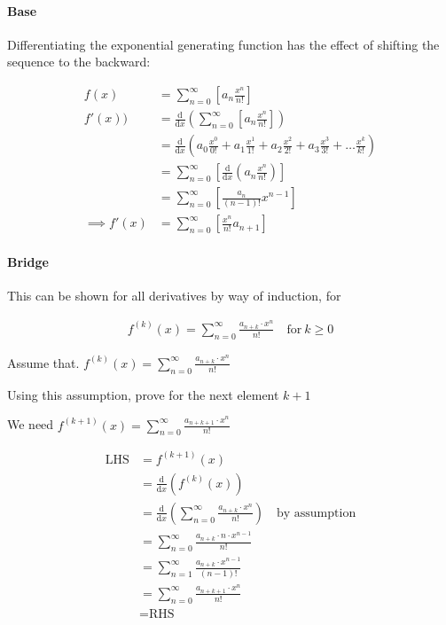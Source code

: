\documentclass[11pt]{article}
\begin{document}
\paragraph{Base}
\label{sec:org97cfa18}
Differentiating the exponential generating function has the effect of shifting the sequence to the backward: \cite{lehmanReadingsMathematicsComputer2010}

\begin{align}
    f\left( x \right) &= \sum^{\infty}_{n= 0}   \left[ a_n \frac{x^n}{n!} \right] \label{eq:exp-pow-series} \\
f'\left( x \right)) &= \frac{\mathrm{d} }{\mathrm{d} x}\left( \sum^{\infty}_{n= 0}   \left[ a_n \frac{x^n}{n!} \right]  \right) \nonumber \\
&= \frac{\mathrm{d}}{\mathrm{d} x} \left( a_0 \frac{x^0}{0!} +  a_1 \frac{x^1}{1!} +  a_2 \frac{x^2}{2!}+  a_3 \frac{x^3}{3! } +  \ldots \frac{x^k}{k!} \right) \nonumber \\
&= \sum^{\infty}_{n= 0}   \left[ \frac{\mathrm{d} }{\mathrm{d} x}\left( a_n \frac{x^n}{n!} \right) \right] \nonumber \\
&= \sum^{\infty}_{n= 0}   {\left[{ \frac{a_n}{{\left({ n- 1 }\right)!}} } x^{n- 1}  \right]} \nonumber \\
\implies f'(x) &= \sum^{\infty}_{n= 0}   {\left[{ \frac{x^n}{n!}a_{n+  1} }\right]} \label{eq:exp-pow-series-sol}
\end{align}

\paragraph{Bridge}
\label{sec:org373b494}
This can be shown for all derivatives by way of induction, for

\begin{align}
f^{(k)}\left(x\right) = \sum_{n=0}^\infty\frac{a_{n+k}\cdot x^n}{n!} \quad \text{for}~k \ge 0
\end{align}

Assume that. \(f^{(k)}\left(x\right) = \sum_{n=0}^\infty\frac{a_{n+k}\cdot x^n}{n!}\)

Using this assumption, prove for the next element \(k+1\)

We need \(f^{(k+1)}(x) = \sum_{n=0}^\infty\frac{a_{n+k+1}\cdot x^n}{n!}\)

\begin{align*}
    \text{LHS} &= f^{(k+1)}(x)\\
    &= \frac{\mathrm{d}}{\mathrm{d}x}\left(f^{(k)}(x)\right)\\
    &= \frac{\mathrm{d}}{\mathrm{d}x}\left(\sum_{n=0}^\infty\frac{a_{n+k}\cdot x^n}{n!}\right)\quad \text{by assumption}\\
    &= \sum_{n=0}^\infty\frac{a_{n+k}\cdot n\cdot x^{n-1}}{n!}\\
    &= \sum_{n=1}^\infty\frac{a_{n+k}\cdot x^{n-1}}{(n-1)!}\\
    &= \sum_{n=0}^\infty\frac{a_{n+k+1}\cdot x^{n}}{n!}\\
    &= \text{RHS}
\end{align*}
\end{document}
